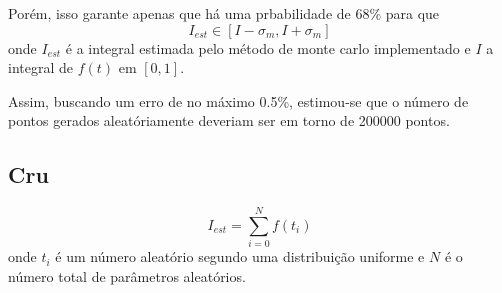 \documentclass [a4paper,10pt]{article}
\begin{document}
  	Porém, isso garante apenas que há uma prbabilidade de 68\% para que
  	\begin{equation}
  		I_{est} \in [I - \sigma_m, I + \sigma_m]
  	\end{equation}
  	onde $I_{est}$ é a integral estimada pelo método de monte carlo implementado e $I$ a integral de $f(t)$
  	em $[0, 1]$.
  	
  	Assim, buscando um erro de no máximo 0.5\%, estimou-se que o número de pontos gerados aleatóriamente
  	deveriam ser em torno de 200000 pontos.
  	\newpage
  	\pagestyle{fancy}
    \fancyhf{}
    \renewcommand{\footrulewidth}{0.0pt}
    \renewcommand{\headrulewidth}{0.1pt}
    \cfoot{\bfseries \thepage}
    
  \subsection{Cru}
    \begin{equation}
  		I_{est} = \sum_{i = 0}^N f(t_i)
  	\end{equation}
    onde $t_i$ é um número aleatório segundo uma distribuição uniforme e $N$ é o número total de
    parâmetros aleatórios.
    {\linespread{1.15}
    }
\end{document}
